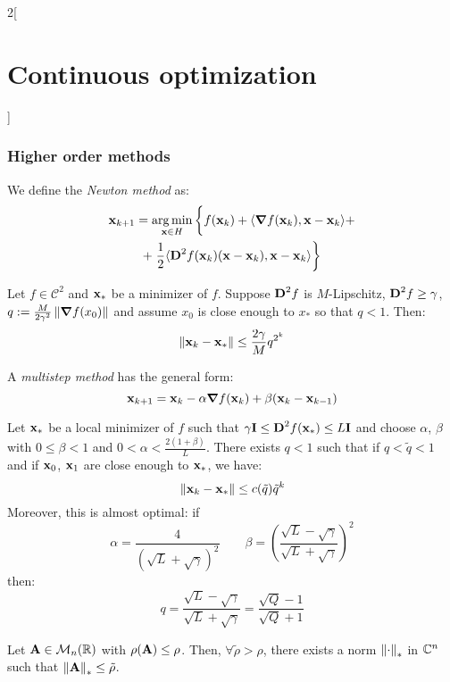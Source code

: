 \documentclass[../../../main_math.tex]{subfiles}
\begin{document}
\begin{multicols}{2}[\section{Continuous optimization}]
  \subsubsection{Higher order methods}
  \begin{definition}
    We define the \emph{Newton method} as:
    \begin{multline*}
      \boldsymbol{\mathrm{x}}_{k+1}=\operatorname*{arg\,min}_{\boldsymbol{\mathrm{x}}\in H} \bigg\{ f(\boldsymbol{\mathrm{x}}_k)+\langle \grad f(\boldsymbol{\mathrm{x}}_k),\boldsymbol{\mathrm{x}}-\boldsymbol{\mathrm{x}}_k\rangle+\\
      +\left.\frac{1}{2}\langle \boldsymbol{\mathrm{D}}^2f(\boldsymbol{\mathrm{x}}_k)(\boldsymbol{\mathrm{x}}-\boldsymbol{\mathrm{x}}_k),\boldsymbol{\mathrm{x}}-\boldsymbol{\mathrm{x}}_k\rangle \right\}
    \end{multline*}
  \end{definition}
  \begin{theorem}
    Let $f\in\mathcal{C}^2$ and $\boldsymbol{\mathrm{x}}_*$ be a minimizer of $f$. Suppose $\boldsymbol{\mathrm{D}}^2f$ is $M$-Lipschitz, $\boldsymbol{\mathrm{D}}^2f\geq \gamma$, $q:=\frac{M}{2\gamma^2}\left\|\grad f({x}_0)\right\|$ and assume ${x}_0$ is close enough to ${x}_*$ so that $q<1$. Then:
    $$
      \left\|\boldsymbol{\mathrm{x}}_k-\boldsymbol{\mathrm{x}}_*\right\|\leq \frac{2\gamma}{M}q^{2^k}
    $$
  \end{theorem}
  \begin{definition}
    A \emph{multistep method} has the general form:
    $$
      \boldsymbol{\mathrm{x}}_{k+1}=\boldsymbol{\mathrm{x}}_k-\alpha \grad f(\boldsymbol{\mathrm{x}}_k)+\beta(\boldsymbol{\mathrm{x}}_k-\boldsymbol{\mathrm{x}}_{k-1})
    $$
  \end{definition}
  \begin{theorem}
    Let $\boldsymbol{\mathrm{x}}_*$ be a local minimizer of $f$ such that $\gamma \boldsymbol{\mathrm{I}}\leq \boldsymbol{\mathrm{D}}^2f(\boldsymbol{\mathrm{x}}_*)\leq L\boldsymbol{\mathrm{I}}$ and choose $\alpha$, $\beta$ with $0\leq \beta <1$ and $0<\alpha<\frac{2(1+\beta)}{L}$. There exists $q<1$ such that if $q<\tilde{q}<1$ and if $\boldsymbol{\mathrm{x}}_0$, $\boldsymbol{\mathrm{x}}_1$ are close enough to $\boldsymbol{\mathrm{x}}_*$, we have:
    $$
      \left\|\boldsymbol{\mathrm{x}}_k-\boldsymbol{\mathrm{x}}_*\right\|\leq c(\tilde{q}){\tilde{q}}^k
    $$
    Moreover, this is almost optimal: if $$
      \alpha=\frac{4}{{(\sqrt{L}+\sqrt{\gamma})}^2}\qquad \beta={\left( \frac{\sqrt{L}-\sqrt{\gamma}}{\sqrt{L}+\sqrt{\gamma}} \right)}^2
    $$
    then:
    $$
      q=\frac{\sqrt{L}-\sqrt{\gamma}}{\sqrt{L}+\sqrt{\gamma}}=\frac{\sqrt{Q}-1}{\sqrt{Q}+1}
    $$
  \end{theorem}
  \begin{lemma}
    Let $\boldsymbol{\mathrm{A}}\in\mathcal{M}_n(\mathbb{R})$ with $\rho(\boldsymbol{\mathrm{A}})\leq \rho$. Then, $\forall \tilde{\rho}>\rho$, there exists a norm $\left\|\cdot\right\|_*$ in $\mathbb{C}^n$ such that $\left\|\boldsymbol{\mathrm{A}}\right\|_*\leq \tilde{\rho}$.
  \end{lemma}
  \begin{definition}

\end{definition}
\end{multicols}
\end{document}
